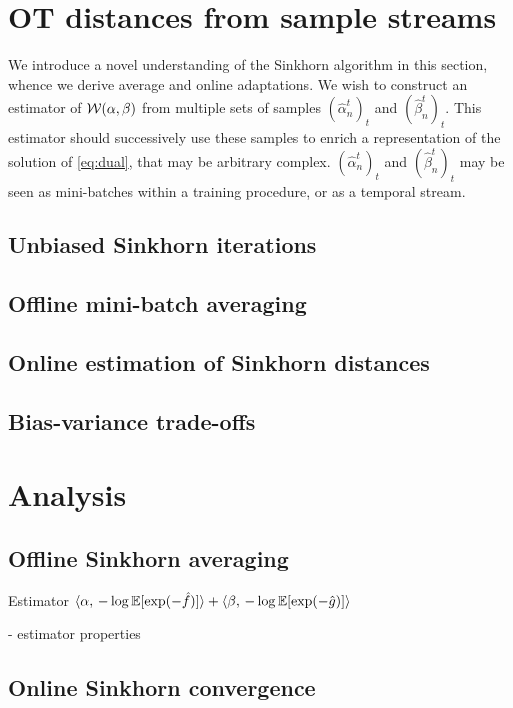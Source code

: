 
\section{OT distances from sample streams}

We introduce a novel understanding of the Sinkhorn algorithm in this section,
whence we derive average and online adaptations. We wish to construct an
estimator of $\mathcal{W}(\alpha,\beta)$ from multiple sets of samples $(\hat
\alpha_n^t)_t$ and $(\hat \beta_n^t)_t$. This estimator should successively use
these samples to enrich a representation of the solution of \eqref{eq:dual},
that may be arbitrary complex. $(\hat \alpha_n^t)_t$ and $(\hat \beta_n^t)_t$
may be seen as mini-batches within a training procedure, or as a temporal stream.

\subsection{Unbiased Sinkhorn iterations}

\subsection{Offline mini-batch averaging}

\subsection{Online estimation of Sinkhorn distances}

\subsection{Bias-variance trade-offs}

\section{Analysis}

\subsection{Offline Sinkhorn averaging}

Estimator $\langle \alpha,\,-\log \mathbb{E}[\exp(-\hat f)]\rangle + \langle \beta,\,-\log \mathbb{E}[\exp(-\hat g)]\rangle$

- estimator properties

\subsection{Online Sinkhorn convergence}

